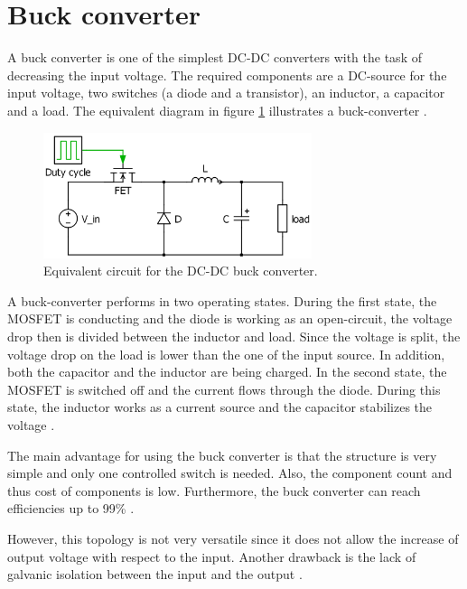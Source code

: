 \section{Buck converter\label{Buck-C}}

A buck converter is one of the simplest DC-DC converters with the task of decreasing the input voltage. The required components are a DC-source for the input voltage, two switches (a diode and a transistor), an inductor, a capacitor and a load. The equivalent diagram in figure \ref{Buck-converter} illustrates a buck-converter . 

\begin{figure}[htbp]
	\begin{center}
		\includegraphics[width=0.7\textwidth]{../Pictures/Buck-converter}
		\caption{Equivalent circuit for the DC-DC buck converter.}
		\label{Buck-converter}
	\end{center}	
\end{figure}

A buck-converter performs in two operating states. 
During the first state, the MOSFET is conducting and the diode is working as an open-circuit, the voltage drop  then is divided between the inductor and load. Since the voltage is split, the voltage drop on the load is lower than the one of the input source. In addition, both the capacitor and the inductor are being charged. In the second state, the MOSFET is switched off and the current flows through the diode. During this state, the inductor works as a current source and the capacitor stabilizes the voltage \cite{schematicbuckandboost}.

The main advantage for using the buck converter is that the structure is very simple and only one controlled  switch is needed. Also, the component count and thus cost of components is low. Furthermore, the buck converter can reach efficiencies up to 99\% \cite{Efficiencybuck}. 

However, this topology is not very versatile since it does not allow the increase of output voltage with respect to the input. Another drawback is the lack of galvanic isolation between the input and the output \cite{advantagebuck}.

